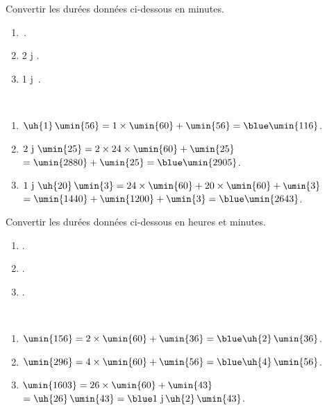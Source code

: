 \begin{colonne*exercice}
\bigskip
 
 
\begin{exercice} %
   Convertir les durées données ci-dessous en minutes.
   \begin{enumerate}
      \item {}\,.
      \item 2  j .
      \item 1 j \,.
   \end{enumerate}
\end{exercice}

\begin{corrige}
   \ \\ [-5mm]
   \begin{enumerate}
      \item $\uh{1}\,\umin{56} =1\times\umin{60}+\umin{56} =\blue \umin{116}$.
      \item $2\text{ j } \umin{25} =2\times24\times\umin{60}+\umin{25}$ \\
         \quad $=\umin{2880}+\umin{25} =\blue \umin{2905}$.
      \item $1\text{ j } \uh{20}\,\umin{3} =24\times\umin{60}+20\times\umin{60}+\small\umin{3}$ \\
         \quad $=\umin{1440}+\umin{1200}+\umin{3} =\blue \umin{2643}$.
   \end{enumerate}
\end{corrige}

\bigskip


\begin{exercice} %
   Convertir les durées données ci-dessous en heures et minutes.
   \begin{enumerate}
      \item {}.
      \item {}.
      \item {}.
   \end{enumerate}
\end{exercice}

\begin{corrige}
   \ \\ [-5mm]
   \begin{enumerate}
      \item $\umin{156} =2\times\umin{60}+\umin{36} =\blue \uh{2}\,\umin{36}$.
      \item $\umin{296} =4\times\umin{60}+\umin{56} =\blue \uh{4}\,\umin{56}$.
      \item $\umin{1603} =26\times\umin{60}+\umin{43}$ \\
         \quad $=\uh{26}\,\umin{43} =\blue 1\text{ j}\,\uh{2}\,\umin{43}$.
   \end{enumerate}
\end{corrige}


\end{colonne*exercice}
